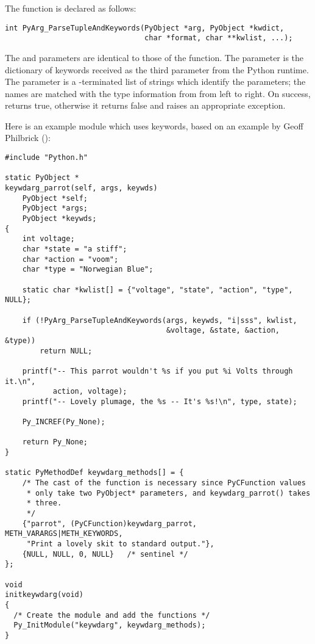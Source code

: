 The  function is declared as
follows:

\begin{verbatim}
int PyArg_ParseTupleAndKeywords(PyObject *arg, PyObject *kwdict,
                                char *format, char **kwlist, ...);
\end{verbatim}

The  and  parameters are identical to those of the
 function.  The  parameter
is the dictionary of keywords received as the third parameter from the
Python runtime.  The  parameter is a \NULL-terminated
list of strings which identify the parameters; the names are matched
with the type information from  from left to right.  On
success,  returns true,
otherwise it returns false and raises an appropriate exception.


Here is an example module which uses keywords, based on an example by
Geoff Philbrick ():%

\begin{verbatim}
#include "Python.h"

static PyObject *
keywdarg_parrot(self, args, keywds)
    PyObject *self;
    PyObject *args;
    PyObject *keywds;
{  
    int voltage;
    char *state = "a stiff";
    char *action = "voom";
    char *type = "Norwegian Blue";

    static char *kwlist[] = {"voltage", "state", "action", "type", NULL};

    if (!PyArg_ParseTupleAndKeywords(args, keywds, "i|sss", kwlist, 
                                     &voltage, &state, &action, &type))
        return NULL; 
  
    printf("-- This parrot wouldn't %s if you put %i Volts through it.\n", 
           action, voltage);
    printf("-- Lovely plumage, the %s -- It's %s!\n", type, state);

    Py_INCREF(Py_None);

    return Py_None;
}

static PyMethodDef keywdarg_methods[] = {
    /* The cast of the function is necessary since PyCFunction values
     * only take two PyObject* parameters, and keywdarg_parrot() takes
     * three.
     */
    {"parrot", (PyCFunction)keywdarg_parrot, METH_VARARGS|METH_KEYWORDS,
     "Print a lovely skit to standard output."},
    {NULL, NULL, 0, NULL}   /* sentinel */
};

void
initkeywdarg(void)
{
  /* Create the module and add the functions */
  Py_InitModule("keywdarg", keywdarg_methods);
}
\end{verbatim}


